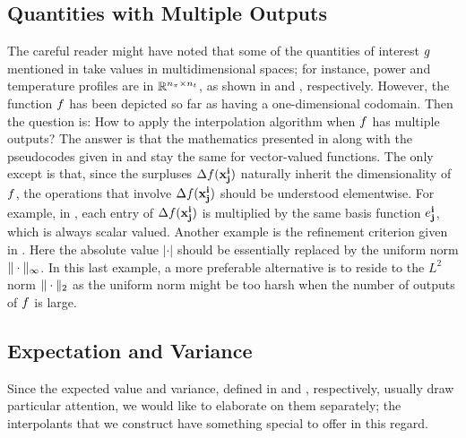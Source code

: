 \subsection{Quantities with Multiple Outputs}
The careful reader might have noted that some of the quantities of interest $g$
mentioned in  take values in multidimensional spaces; for
instance, power and temperature profiles are in $\mathbb{R}^{{n_\pi} \times {n_t}}$, as
shown in  and , respectively.
However, the function $f$ has been depicted so far as having a one-dimensional
codomain. Then the question is: How to apply the interpolation algorithm when
$f$ has multiple outputs? The answer is that the mathematics presented in
 along with the pseudocodes given in  and
 stay the same for vector-valued functions. The only except is
that, since the surpluses $\Delta f(\mathbf{x}^{\mathbf{i}}_{\mathbf{j}})$ naturally inherit the
dimensionality of $f$, the operations that involve $\Delta f(\mathbf{x}^{\mathbf{i}}_{\mathbf{j}})$
should be understood elementwise. For example, in ,
each entry of $\Delta f(\mathbf{x}^{\mathbf{i}}_{\mathbf{j}})$ is multiplied by the same basis function
$e^{\mathbf{i}}_{\mathbf{j}}$, which is always scalar valued. Another example is the refinement
criterion given in . Here the absolute value $|\cdot|$ should be
essentially replaced by the uniform norm $\| \cdot \|_\infty$. In this last
example, a more preferable alternative is to reside to the $L^2$ norm
$\| \cdot \|_2$ as the uniform norm might be too harsh when the number of
outputs of $f$ is large.

\subsection{Expectation and Variance}
Since the expected value and variance, defined in  and
, respectively, usually draw particular attention, we would like
to elaborate on them separately; the interpolants that we construct have
something special to offer in this regard.

